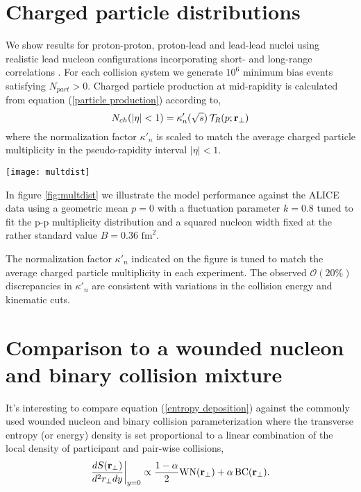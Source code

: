 \documentclass[aps,prl,reprint,amsmath,nofootinbib]{revtex4-1}
\begin{document}
\section{Charged particle distributions}

We show results for proton-proton, proton-lead and lead-lead nuclei using realistic lead nucleon configurations incorporating short- and long-range 
correlations \cite{nucleon-correlations}. For each collision system we generate $10^6$ minimum bias events satisfying $N_{part} > 0$. Charged particle
production at mid-rapidity is calculated from equation (\ref{particle production}) according to, 
\begin{equation}
 N_{ch}(|\eta|<1) = \kappa'_n(\sqrt{s})\, \mathcal{T}_R(p;{\bf r}_\perp)
\end{equation}
where the normalization factor $\kappa'_n$ is scaled to match the average charged particle multiplicity in the pseudo-rapidity interval $|\eta| < 1$.
\begin{figure*}[ht]
    \texttt{[image: multdist]}
    \caption{\label{fig:multdist} Minimum bias pp, pPb and PbPb charged particle distributions for power $p=0$, fluctuation parameter $k=0.8$, squared nucleon width 
    $B=0.36~fm^2$ and normalization factor $\kappa'_n$ indicated in the legend.}
\end{figure*}

In figure \ref{fig:multdist} we illustrate the model performance against the ALICE data using a geometric mean $p=0$ with a fluctuation parameter $k=0.8$ tuned 
to fit the p-p multiplicity distribution and a squared nucleon width fixed at the rather standard value $B=0.36$ $\mbox{fm}^2$. 

The normalization factor $\kappa'_n$ indicated on the figure is tuned to match the average charged particle multiplicity in each experiment. The observed
$\mathcal{O}(20\%)$ discrepancies in $\kappa'_n$ are consistent with variations in the collision energy and kinematic cuts.

\section{Comparison to a wounded nucleon and binary collision mixture}

It's interesting to compare equation (\ref{entropy deposition}) against the commonly used wounded nucleon and binary collision parameterization where the 
transverse entropy (or energy) density is set proportional to a linear combination of the local density of participant and pair-wise collisions,
\begin{equation}
 \label{glb ansatz}
 \frac{dS({\bf r}_\perp)}{d^2r_\perp dy} \biggr \rvert_{y=0}  \propto \frac{1-\alpha}{2}\mbox{WN}({\bf r_\perp}) + \alpha\, \mbox{BC}({\bf r_\perp}). 
\end{equation}
\end{document}
